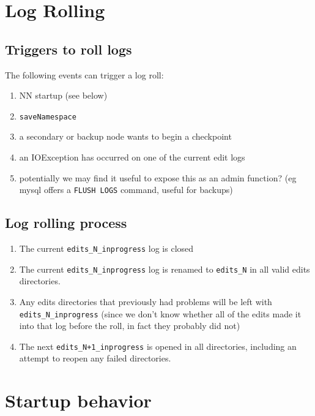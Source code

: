 \documentclass{article}
\begin{document}
\section{Log Rolling}

\subsection{Triggers to roll logs}
The following events can trigger a log roll:

\begin{enumerate}
\item NN startup (see below)
\item {\tt saveNamespace}
\item a secondary or backup node wants to begin a checkpoint
\item an IOException has occurred on one of the current edit logs
\item potentially we may find it useful to expose this as an admin function? (eg mysql offers a {\tt FLUSH LOGS} command, useful for backups)
\end{enumerate}

\subsection{Log rolling process}

\begin{enumerate}
\item The current {\tt edits\_N\_inprogress} log is closed
\item The current {\tt edits\_N\_inprogress} log is renamed to {\tt edits\_N} in all valid edits directories.
\item Any edits directories that previously had problems will be left with {\tt edits\_N\_inprogress} (since we don't know whether all of the edits made it into that log before the roll, in fact they probably did not)
\item The next {\tt edits\_N+1\_inprogress} is opened in all directories, including an attempt to reopen any failed directories.
\end{enumerate}

\section{Startup behavior}
\end{document}

